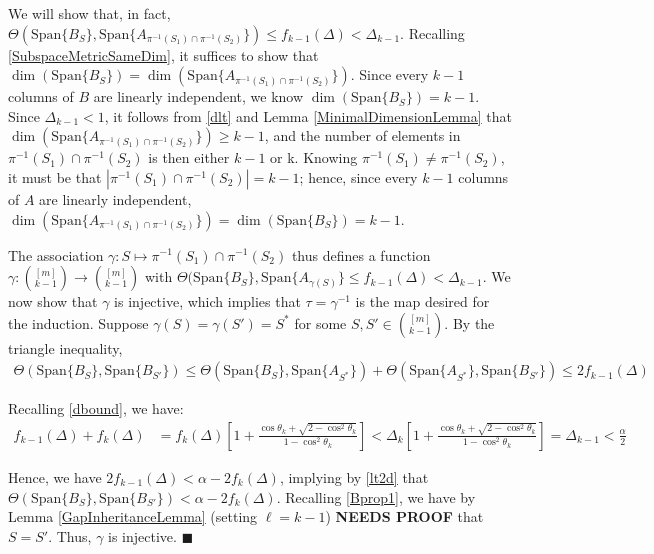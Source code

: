 \documentclass[journal,onecolumn]{IEEEtran}
\begin{document}
We will show that, in fact, $\Theta\left( \text{Span}\{B_S\}, \text{Span}\{A_{\pi^{-1}(S_1) \cap \pi^{-1}(S_2)}\} \right) \leq f_{k-1}(\Delta) < \Delta_{k-1}$. Recalling \eqref{SubspaceMetricSameDim}, it suffices to show that $\dim(\text{Span}\{B_{S}\}) = \dim( \text{Span}\{A_{\pi^{-1}(S_1) \cap \pi^{-1}(S_2)}\})$. Since every $k-1$ columns of $B$ are linearly independent, we know $\dim(\text{Span}\{B_{S}\}) = k-1$. Since $\Delta_{k-1} < 1$, it follows from \eqref{dlt} and Lemma \ref{MinimalDimensionLemma} that $\dim(\text{Span}\{A_{\pi^{-1}(S_1) \cap \pi^{-1}(S_2)}\}) \geq k-1$, and the number of elements in $\pi^{-1}(S_1) \cap \pi^{-1}(S_2)$ is then either $k-1$ or k. Knowing $\pi^{-1}(S_1) \neq \pi^{-1}(S_2)$, it must be that $|\pi^{-1}(S_1) \cap \pi^{-1}(S_2)| = k-1$; hence, since every $k-1$ columns of $A$ are linearly independent, $\dim(\text{Span}\{A_{\pi^{-1}(S_1) \cap \pi^{-1}(S_2)}\}) = \dim(\text{Span}\{B_{S}\}) = k-1$. 

The association $\gamma: S \mapsto \pi^{-1}(S_1) \cap \pi^{-1}(S_2)$ thus defines a function $\gamma: {[m] \choose k-1} \to {[m] \choose k-1}$ with $\Theta(\text{Span}\{B_S\}, \text{Span}\{A_{\gamma(S)}\} \leq f_{k-1}(\Delta) < \Delta_{k-1}$. We now show that $\gamma$ is injective, which implies that $\tau = \gamma^{-1}$ is the map desired for the induction. Suppose $\gamma(S) = \gamma(S') = S^*$ for some $S, S' \in {[m] \choose k-1}$.  By the triangle inequality, 
\begin{align}\label{lt2d}
\Theta(\text{Span}\{B_S\}, \text{Span}\{B_{S'}\}) \leq \Theta(\text{Span}\{B_S\}, \text{Span}\{A_{S^*}\}) + \Theta(\text{Span}\{A_{S^*}\}, \text{Span}\{B_{S'}\}) \leq 2f_{k-1}(\Delta)
\end{align}

Recalling \eqref{dbound}, we have:
\begin{align}\label{inductionineq}
f_{k-1}(\Delta) + f_k(\Delta) 
&= f_k(\Delta)\left[ 1 + \frac{\cos\theta_k + \sqrt{2 - \cos^2\theta_k}}{1 - \cos^2\theta_k} \right] 
< \Delta_k \left[ 1 + \frac{\cos\theta_k + \sqrt{2 - \cos^2\theta_k}}{1 - \cos^2\theta_k} \right] 
= \Delta_{k-1}
< \frac{\alpha}{2}
\end{align}

Hence, we have  $2f_{k-1}(\Delta) < \alpha - 2f_k(\Delta)$, implying by \eqref{lt2d} that $\Theta(\text{Span}\{B_S\}, \text{Span}\{B_{S'}\}) < \alpha - 2f_k(\Delta)$. Recalling \eqref{Bprop1}, we have by Lemma \ref{GapInheritanceLemma} (setting $\ell = k-1$) \textbf{NEEDS PROOF} that $S = S'$. Thus, $\gamma$ is injective. \indent $\blacksquare$
\end{document}
